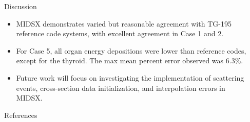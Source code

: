 \documentclass[final]{beamer}
\newlength{\sepwidth}
\newlength{\colwidth}
\newcommand{\separatorcolumn}{\begin{column}{\sepwidth}\end{column}}
\begin{document}
\begin{frame}[t]
\begin{columns}[t]
\begin{column}{\colwidth}
  \begin{block}{Discussion}

  \begin{itemize}
      \item MIDSX demonstrates varied but reasonable agreement with TG-195 reference code systems, with excellent agreement in Case 1 and 2.
      \item For Case 5, all organ energy depositions were lower than reference codes, except for the thyroid. The max mean percent error observed was 6.3\%.
      \item Future work will focus on investigating the implementation of scattering events, cross-section data initialization, and interpolation errors in MIDSX.
  \end{itemize}
    
  \end{block}
  \vspace{-1\baselineskip}
  \begin{block}{References}

    \vspace{-0.5\baselineskip}
    \footnotesize{}

  \end{block}

\end{column}

\separatorcolumn
\end{columns}
\end{frame}
\end{document}
